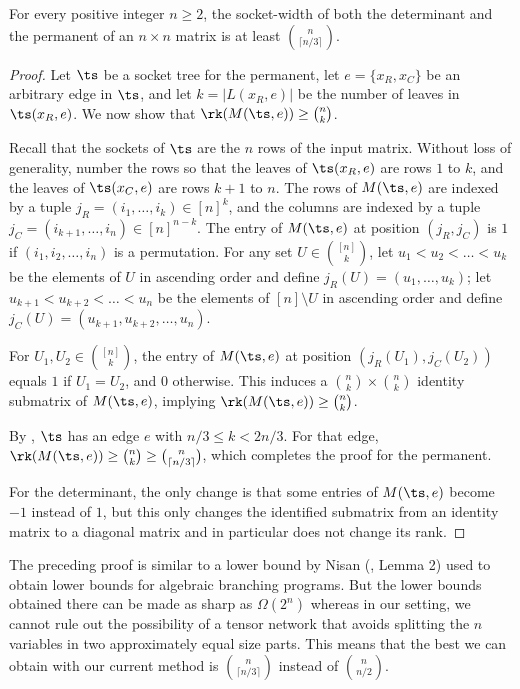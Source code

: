 \begin{lemma}
For every positive integer $n\geq 2$, the socket-width of both the determinant and the permanent of an $n\times n$ matrix is at least $\binom{n}{\lceil n/3 \rceil}$.
\end{lemma}
\begin{proof}
  Let $\ts$ be a socket tree for the permanent, let $e = \{x_R,
  x_C\}$ be an arbitrary edge in $\ts$, and let $k = |L(x_R, e)|$ 
be the number of
  leaves in $\ts(x_R, e)$.  We now show that $\rk(M(\ts, e)) \ge
  \binom{n}{k}$.

  Recall that the sockets of $\ts$ are the $n$ rows of the input
  matrix.  Without loss of generality, number the rows so that the
  leaves of $\ts(x_R, e)$ are rows $1$ to $k$, and the leaves of $\ts(x_C,
  e)$ are rows $k+1$ to $n$.  The rows of $M(\ts, e)$ are indexed by
  a tuple $j_R = (i_1, \ldots, i_k) \in [n]^k$, and the columns are indexed by a
  tuple $j_C = (i_{k+1}, \ldots, i_n) \in [n]^{n-k}$.  The entry of
  $M(\ts, e)$ at position $(j_R, j_C)$ is $1$ if $(i_1, i_2, \ldots,
  i_n)$ is a permutation.  For any set $U \in \binom{[n]}{k}$, let $u_1 <
  u_2 < \ldots < u_k$ be the elements of $U$ in ascending order and
  define $j_R(U) = (u_1, \ldots, u_k)$; let $u_{k+1} < u_{k+2} < \ldots < u_{n}$ be the elements of $[n]
  \setminus U$ in ascending order and define $j_C(U) = (u_{k+1}, u_{k+2}, \ldots,
  u_n)$.

  For $U_1, U_2 \in \binom{[n]}{k}$, the entry of $M(\ts, e)$ at position $(j_R(U_1),
  j_C(U_2))$ equals $1$ if $U_1 = U_2$, and $0$ otherwise. This
  induces a $\binom{n}{k} \times \binom{n}{k}$ identity submatrix
  of $M(\ts, e)$, implying $\rk(M(\ts, e)) \ge \binom{n}{k}$.

  By , $\ts$ has an edge $e$ with $n/3
  \le k < 2n/3$.  For that edge, $\rk(M(\ts, e)) \ge \binom{n}{k} \ge \binom{n}{\lceil n/3 \rceil}$, which completes the proof for the permanent.

  For the determinant, the only change is that some
  entries of $M(\ts, e)$ become $-1$ instead of $1$, but this only changes the
  identified submatrix from an identity matrix to a diagonal matrix and
  in particular does not change its rank.
\end{proof}

The preceding proof is similar to a lower bound by Nisan
(\cite{Nisan91}, Lemma 2) used to obtain lower bounds for algebraic
branching programs.  But the lower bounds obtained there can be made
as sharp as $\Omega(2^n)$ whereas in our setting, we cannot rule out
the possibility of a tensor network that avoids splitting the $n$
variables in two approximately equal size parts.  This means that the best we can
obtain with our current method is $\binom{n}{\lceil n/3 \rceil}$
instead of $\binom{n}{n/2}$.

